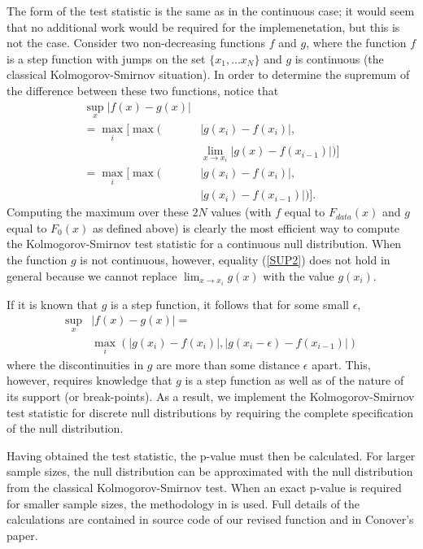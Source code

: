 The form of the test statistic is the same as in the
continuous case; it would seem that no additional work would be required
for the implemenetation, but this is not the case.
Consider two non-decreasing functions $f$ and $g$, where the function $f$ is a step function with jumps on the set $\{x_1, \ldots x_N \}$ and $g$
is continuous (the classical Kolmogorov-Smirnov situation).
In order to determine the supremum of the difference between
these two functions, notice that
\begin{align}
\sup_x \left| f(x) - g(x) \right| &  \nonumber  \\
       =  \max_i \bigg[ \max\bigg(  & \left|g(x_i) - f(x_i) \right|, \nonumber \\
& \lim_{x \rightarrow x_i} \left| g(x) - f(x_{i-1})
   \right| \bigg) \bigg] \label{SUP1}\\
=  \max_i \bigg[\max \bigg( & \left|g(x_i) - f(x_i) \right|, \nonumber \\
& \left| g(x_i) - f(x_{i-1}) \right| \bigg) \bigg]. \label{SUP2}
\end{align}
Computing the maximum over these $2N$
values (with $f$ equal to
$F_{data}(x)$ and $g$ equal to $F_0(x)$ as defined above) is clearly the 
most efficient way to compute the Kolmogorov-Smirnov test statistic for
a continuous null distribution. When the function $g$ is not
continuous, however, equality (\ref{SUP2}) does not hold in general because 
we cannot replace $\lim_{x\rightarrow x_i} g(x)$ with the value $g(x_i)$. 

If it is known that $g$ is a step function, it follows that
for some small $\epsilon$,
\begin{align}
\sup_x &\left| f(x)- g(x) \right| =  \nonumber \\
        & \max_i \left( \left|g(x_i) - f(x_i) \right|, 
    \left| g(x_i - \epsilon) - f(x_{i-1}) \right| \right) \label{epsilon}
\end{align}
where the discontinuities in $g$ are more than some distance $\epsilon$ apart. 
This, however, requires knowledge that $g$ is a step function as well as of
the nature of its support (or break-points).  As a result,
we implement the Kolmogorov-Smirnov test statistic for discrete null
distributions by requiring the complete specification of the null distribution.


Having obtained the test statistic, the p-value must then be calculated. 
For larger sample sizes, the null distribution can be approximated
with the null distribution from the classical Kolmogorov-Smirnov test. 
When an exact p-value is required for
smaller sample sizes, the methodology in \citet{Conover1972} is used. 
Full details of the calculations are contained in source code
of our revised function  and in Conover's paper. 



